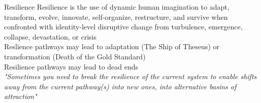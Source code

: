 \documentclass{beamer}
\begin{document}
\begin{frame}{Resilience}
\large {Resilience is the use of dynamic human imagination to adapt, transform, evolve, innovate, self-organize, restructure, and survive when confronted with identity-level disruptive change from turbulence, emergence, collapse, devastation, or crisis} \\
\vspace{5 mm}
\large {Reslience pathways may lead to adaptation (The Ship of Theseus) or transformation (Death of the Gold Standard)}\\ 
\vspace{5 mm}
\large {Resilience pathways may lead to dead ends}\\
\vspace{6 mm}
\large \textit{"Sometimes you need to break the resilience of the current system to enable shifts away from the current pathway(s) into new ones, into alternative basins of attraction"}

\end{frame}




\end{document}
